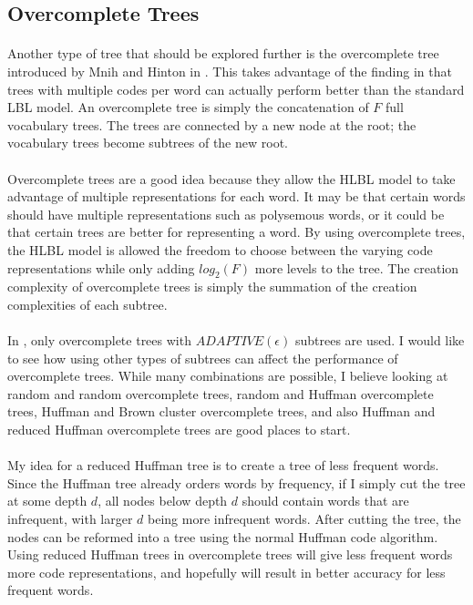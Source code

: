\subsection{Overcomplete Trees}
\paragraph{}
Another type of tree that should be explored further is the overcomplete tree introduced by Mnih and Hinton in \cite{MnihHinton2009}. This takes advantage of the finding in \cite{MnihHinton2009} that trees with multiple codes per word can actually perform better than the standard LBL model. An overcomplete tree is simply the concatenation of $F$ full vocabulary trees. The trees are connected by a new node at the root; the vocabulary trees become subtrees of the new root. 
\paragraph{}
Overcomplete trees are a good idea because they allow the HLBL model to take advantage of multiple representations for each word. It may be that certain words should have multiple representations such as polysemous words, or it could be that certain trees are better for representing a word. By using overcomplete trees, the HLBL model is allowed the freedom to choose between the varying code representations while only adding $log_2(F)$ more levels to the tree. The creation complexity of overcomplete trees is simply the summation of the creation complexities of each subtree.
\paragraph{}
In \cite{MnihHinton2009}, only overcomplete trees with $ADAPTIVE(\epsilon)$ subtrees are used. I would like to see how using other types of subtrees can affect the performance of overcomplete trees. While many combinations are possible, I believe looking at random and random overcomplete trees, random and Huffman overcomplete trees, Huffman and Brown cluster overcomplete trees, and also Huffman and reduced Huffman overcomplete trees are good places to start.
\paragraph{}
My idea for a reduced Huffman tree is to create a tree of less frequent words. Since the Huffman tree already orders words by frequency, if I simply cut the tree at some depth $d$, all nodes below depth $d$ should contain words that are infrequent, with larger $d$ being more infrequent words. After cutting the tree, the nodes can be reformed into a tree using the normal Huffman code algorithm. Using reduced Huffman trees in overcomplete trees will give less frequent words more code representations, and hopefully will result in better accuracy for less frequent words.

